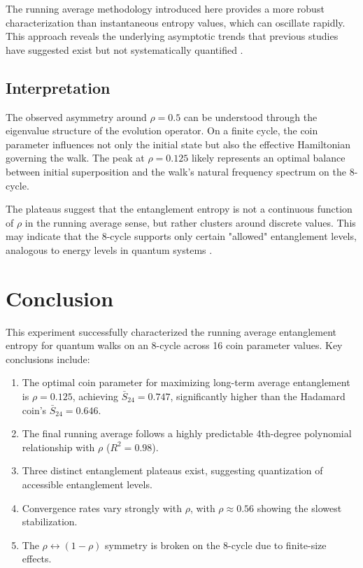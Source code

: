 \documentclass[11pt,a4paper]{article}
\begin{document}
The running average methodology introduced here provides a more robust characterization than instantaneous entropy values, which can oscillate rapidly. This approach reveals the underlying asymptotic trends that previous studies have suggested exist but not systematically quantified \citep{bauer2024}.

\subsection{Interpretation}

The observed asymmetry around $\rho = 0.5$ can be understood through the eigenvalue structure of the evolution operator. On a finite cycle, the coin parameter influences not only the initial state but also the effective Hamiltonian governing the walk. The peak at $\rho = 0.125$ likely represents an optimal balance between initial superposition and the walk's natural frequency spectrum on the 8-cycle.

The plateaus suggest that the entanglement entropy is not a continuous function of $\rho$ in the running average sense, but rather clusters around discrete values. This may indicate that the 8-cycle supports only certain "allowed" entanglement levels, analogous to energy levels in quantum systems \citep{panahiyan2019}.

\section{Conclusion}

This experiment successfully characterized the running average entanglement entropy for quantum walks on an 8-cycle across 16 coin parameter values. Key conclusions include:

\begin{enumerate}
    \item The optimal coin parameter for maximizing long-term average entanglement is $\rho = 0.125$, achieving $\bar{S}_{24} = 0.747$, significantly higher than the Hadamard coin's $\bar{S}_{24} = 0.646$.
    \item The final running average follows a highly predictable 4th-degree polynomial relationship with $\rho$ ($R^2 = 0.98$).
    \item Three distinct entanglement plateaus exist, suggesting quantization of accessible entanglement levels.
    \item Convergence rates vary strongly with $\rho$, with $\rho \approx 0.56$ showing the slowest stabilization.
    \item The $\rho \leftrightarrow (1-\rho)$ symmetry is broken on the 8-cycle due to finite-size effects.
\end{enumerate}
\end{document}
